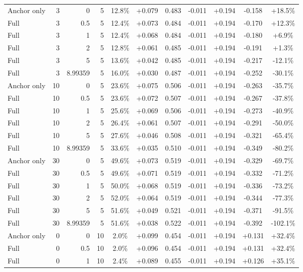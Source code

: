 \begin{table}[htbp]
\begin{tabular}{lrrrccccccc}
Anchor only & 3 & 0 & 5 & 12.8\% & +0.079 & 0.483 & -0.011 & +0.194 & -0.158 & +18.5\% \\
Full & 3 & 0.5 & 5 & 12.4\% & +0.073 & 0.484 & -0.011 & +0.194 & -0.170 & +12.3\% \\
Full & 3 & 1 & 5 & 12.4\% & +0.068 & 0.484 & -0.011 & +0.194 & -0.180 & +6.9\% \\
Full & 3 & 2 & 5 & 12.8\% & +0.061 & 0.485 & -0.011 & +0.194 & -0.191 & +1.3\% \\
Full & 3 & 5 & 5 & 13.6\% & +0.042 & 0.485 & -0.011 & +0.194 & -0.217 & -12.1\% \\
Full & 3 & 8.99359 & 5 & 16.0\% & +0.030 & 0.487 & -0.011 & +0.194 & -0.252 & -30.1\% \\
Anchor only & 10 & 0 & 5 & 23.6\% & +0.075 & 0.506 & -0.011 & +0.194 & -0.263 & -35.7\% \\
Full & 10 & 0.5 & 5 & 23.6\% & +0.072 & 0.507 & -0.011 & +0.194 & -0.267 & -37.8\% \\
Full & 10 & 1 & 5 & 25.6\% & +0.069 & 0.506 & -0.011 & +0.194 & -0.273 & -40.9\% \\
Full & 10 & 2 & 5 & 26.4\% & +0.061 & 0.507 & -0.011 & +0.194 & -0.291 & -50.0\% \\
Full & 10 & 5 & 5 & 27.6\% & +0.046 & 0.508 & -0.011 & +0.194 & -0.321 & -65.4\% \\
Full & 10 & 8.99359 & 5 & 33.6\% & +0.035 & 0.510 & -0.011 & +0.194 & -0.349 & -80.2\% \\
Anchor only & 30 & 0 & 5 & 49.6\% & +0.073 & 0.519 & -0.011 & +0.194 & -0.329 & -69.7\% \\
Full & 30 & 0.5 & 5 & 49.6\% & +0.071 & 0.519 & -0.011 & +0.194 & -0.332 & -71.2\% \\
Full & 30 & 1 & 5 & 50.0\% & +0.068 & 0.519 & -0.011 & +0.194 & -0.336 & -73.2\% \\
Full & 30 & 2 & 5 & 52.0\% & +0.064 & 0.519 & -0.011 & +0.194 & -0.344 & -77.3\% \\
Full & 30 & 5 & 5 & 51.6\% & +0.049 & 0.521 & -0.011 & +0.194 & -0.371 & -91.5\% \\
Full & 30 & 8.99359 & 5 & 51.6\% & +0.038 & 0.522 & -0.011 & +0.194 & -0.392 & -102.1\% \\
Anchor only & 0 & 0 & 10 & 2.0\% & +0.099 & 0.454 & -0.011 & +0.194 & +0.131 & +32.4\% \\
Full & 0 & 0.5 & 10 & 2.0\% & +0.096 & 0.454 & -0.011 & +0.194 & +0.131 & +32.4\% \\
Full & 0 & 1 & 10 & 2.4\% & +0.089 & 0.455 & -0.011 & +0.194 & +0.126 & +35.1\% \\

\end{tabular}
\end{table}
